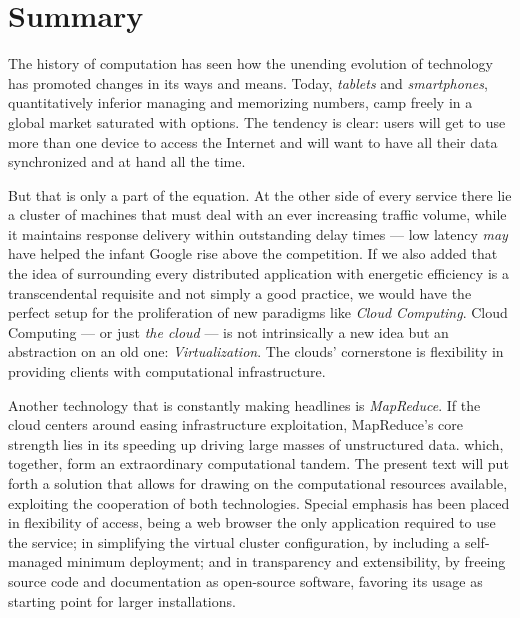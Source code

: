 \chapter*{Summary}
\noindent The history of computation has seen how the unending evolution of technology has promoted changes in its ways and means. Today, \textit{tablets} and \textit{smartphones}, quantitatively inferior managing and memorizing numbers, camp freely in a global market saturated with options. The tendency is clear: users will get to use more than one device to access the Internet and will want to have all their data synchronized and at hand all the time.

But that is only a part of the equation. At the other side of every service there lie a cluster of machines that must deal with an ever increasing traffic volume, while it maintains response delivery within outstanding delay times --- low latency \emph{may} have helped the infant Google rise above the competition. If we also added that the idea of surrounding every distributed application with energetic efficiency is a transcendental requisite and not simply a good practice, we would have the perfect setup for the proliferation of new paradigms like \emph{Cloud Computing}. Cloud Computing --- or just \emph{the cloud} --- is not intrinsically a new idea but an abstraction on an old one: \emph{Virtualization}. The clouds' cornerstone is flexibility in providing clients with computational infrastructure.

Another technology that is constantly making headlines is \emph{MapReduce}. If the cloud centers around easing infrastructure exploitation, MapReduce's core strength lies in its speeding up driving large masses of unstructured data. which, together, form an extraordinary computational tandem. The present text will put forth a solution that allows for drawing on the computational resources available, exploiting the cooperation of both technologies. Special emphasis has been placed in flexibility of access, being a web browser the only application required to use the service; in simplifying the virtual cluster configuration, by including a self-managed minimum deployment; and in transparency and extensibility, by freeing source code and documentation as open-source software, favoring its usage as starting point for larger installations.
